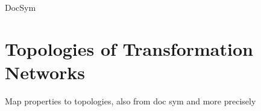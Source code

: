 \begin{copiedFrom}{DocSym}







\end{copiedFrom} %


\section{Topologies of Transformation Networks}
Map properties to topologies, also from doc sym and more precisely